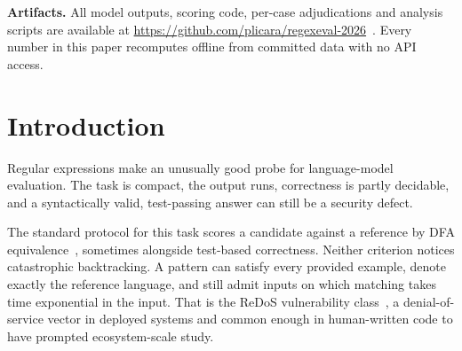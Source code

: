 \documentclass[11pt]{article}
\begin{document}
\begin{abstract}
Third, we quantify what a reference-dependent metric costs. Metrics that
compare generated output against a human answer key inherit that key's error
rate, a dependency documented for image and text benchmarks
\citep{northcutt2021labelerrors} but not, to our knowledge, quantified for
this one. In a random sample of disagreements where a model passed every test
yet was scored as semantically different, the model was clearly at fault in
roughly 15\% of cases. The rest split between demonstrably incorrect reference
patterns (including a reference character class containing a literal
\texttt{|}) and prompts that never specified the property in dispute. A
composite conjoining correctness, safety and equivalence therefore draws
\equivshare{}\% of its headline gap from its least reliable term, and it
further awards free credit wherever equivalence is undecidable, which rewards
putting an answer beyond checking. We also show that independent binomial
intervals, the default in this literature, are the wrong inferential tool when
all systems answer identical items, and that a paired bootstrap resolves nine
times as many pairwise comparisons on the same data.

We release all raw generations, scoring code and adjudications, and recommend that evaluations separate
reference-dependent from reference-independent metrics, assign them different
evidentiary weight, and treat any effect size as corpus-local until
replicated.
\end{abstract}

\vspace{0.5em}
\noindent\textbf{Artifacts.} All model outputs, scoring code, per-case
adjudications and analysis scripts are available at
\url{https://github.com/plicara/regexeval-2026}~\citep{regexeval-2026}. Every number in
this paper recomputes offline from committed data with no API access.

\section{Introduction}

Regular expressions make an unusually good probe for language-model
evaluation. The task is compact, the output runs, correctness is partly
decidable, and a syntactically valid, test-passing answer can still be a
security defect.

The standard protocol for this task scores a candidate against a reference
by DFA equivalence~\citep{locascio2016neural,kushman2013semantic}, sometimes
alongside test-based correctness. Neither criterion notices catastrophic
backtracking. A pattern can satisfy every provided example, denote exactly the
reference language, and still admit inputs on which matching takes time
exponential in the input. That is the ReDoS vulnerability
class~\citep{davis2018redos}, a denial-of-service vector in deployed systems
and common enough in human-written code to have prompted ecosystem-scale
study.
\end{document}
